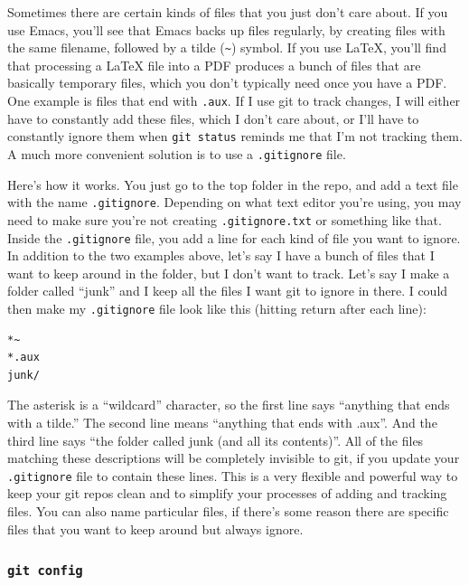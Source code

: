 \documentclass{article}
\begin{document}
Sometimes there are certain kinds of files that you just don't care about.  If you use Emacs, you'll see that Emacs backs up files regularly, by creating files with the same filename, followed by a tilde (\texttt{\textasciitilde{}}) symbol. If you use \LaTeX{}, you'll find that processing a \LaTeX{} file into a PDF produces a bunch of files that are basically temporary files, which you don't typically need once you have a PDF.  One example is files that end with \texttt{.aux}.  If I use git to track changes, I will either have to constantly add these files, which I don't care about, or I'll have to constantly ignore them when \texttt{git status} reminds me that I'm not tracking them.  A much more convenient solution is to use a \texttt{.gitignore} file.  

Here's how it works. You just go to the top folder in the repo, and add a text file with the name \texttt{.gitignore}.  Depending on what text editor you're using, you may need to make sure you're not creating \texttt{.gitignore.txt} or something like that.  Inside the \texttt{.gitignore} file, you add a line for each kind of file you want to ignore.  In addition to the two examples above, let's say I have a bunch of files that I want to keep around in the folder, but I don't want to track. Let's say I make a folder called ``junk'' and I keep all the files I want git to ignore in there.  I could then make my \texttt{.gitignore} file look like this (hitting return after each line):


\begin{verbatim}
*~
*.aux
junk/
\end{verbatim}

The asterisk is a ``wildcard'' character, so the first line says ``anything that ends with a tilde.''  The second line means ``anything that ends with .aux''. And the third line says ``the folder called junk (and all its contents)''.  All of the files matching these descriptions will be completely invisible to git, if you update your \texttt{.gitignore} file to contain these lines. This is a very flexible and powerful way to keep your git repos clean and to simplify your processes of adding and tracking files.  You can also name particular files, if there's some reason there are specific files that you want to keep around but always ignore.
\subsubsection{\texttt{git config}}
\label{sec-5-7-2}
\label{gitconfig}
\end{document}
